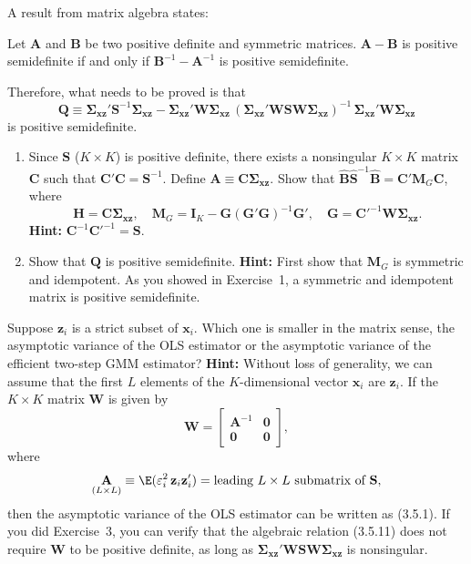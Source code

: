 \begin{problemset}
A result from matrix algebra states:

Let $\mathbf{A}$ and $\mathbf{B}$ be two positive definite and symmetric matrices.
$\mathbf{A} - \mathbf{B}$ is positive semidefinite if and only if
$\mathbf{B}^{-1} - \mathbf{A}^{-1}$ is positive semidefinite.

Therefore, what needs to be proved is that
\[
  \mathbf{Q} \equiv
  \boldsymbol{\Sigma}_{\mathbf{xz}}' \mathbf{S}^{-1} \boldsymbol{\Sigma}_{\mathbf{xz}}
  - \boldsymbol{\Sigma}_{\mathbf{xz}}' \mathbf{W} \boldsymbol{\Sigma}_{\mathbf{xz}}\,
  (\boldsymbol{\Sigma}_{\mathbf{xz}}' \mathbf{W} \mathbf{S} \mathbf{W}
  \boldsymbol{\Sigma}_{\mathbf{xz}})^{-1}\,
  \boldsymbol{\Sigma}_{\mathbf{xz}}' \mathbf{W} \boldsymbol{\Sigma}_{\mathbf{xz}}
\]
is positive semidefinite.

\begin{enumerate}[label=(\alph*)]
\item Since $\mathbf{S}$ ($K \times K$) is positive definite, there exists a nonsingular $K \times K$
  matrix $\mathbf{C}$ such that $\mathbf{C}'\mathbf{C} = \mathbf{S}^{-1}$.  Define
  $\mathbf{A} \equiv \mathbf{C}\boldsymbol{\Sigma}_{\mathbf{xz}}$.  Show that
  $\hat{\mathbf{B}} \hat{\mathbf{S}}^{-1} \hat{\mathbf{B}} = \mathbf{C}'\mathbf{M}_G\mathbf{C}$,
  where
  \[
    \mathbf{H} = \mathbf{C}\boldsymbol{\Sigma}_{\mathbf{xz}}, \quad
    \mathbf{M}_G = \mathbf{I}_K - \mathbf{G}(\mathbf{G}'\mathbf{G})^{-1}\mathbf{G}',
    \quad \mathbf{G} = \mathbf{C}'^{-1}\mathbf{W}\boldsymbol{\Sigma}_{\mathbf{xz}}.
  \]
  \textbf{Hint:} $\mathbf{C}^{-1}\mathbf{C}'^{-1} = \mathbf{S}$.

\item Show that $\mathbf{Q}$ is positive semidefinite.
  \textbf{Hint:} First show that $\mathbf{M}_G$ is symmetric and idempotent.  As you showed in
  Exercise~1, a symmetric and idempotent matrix is positive semidefinite.
\end{enumerate}

\exercise[4]
Suppose $\mathbf{z}_i$ is a strict subset of $\mathbf{x}_i$.  Which one is smaller in the matrix sense,
the asymptotic variance of the OLS estimator or the asymptotic variance of
the efficient two-step GMM estimator?  \textbf{Hint:} Without loss of generality, we can
assume that the first $L$ elements of the $K$-dimensional vector $\mathbf{x}_i$ are $\mathbf{z}_i$.
If the $K \times K$ matrix $\mathbf{W}$ is given by
\[
  \mathbf{W} = \begin{bmatrix} \mathbf{A}^{-1} & \mathbf{0} \\
  \mathbf{0} & \mathbf{0} \end{bmatrix},
\]
where
\[
  \underset{(L \times L)}{\mathbf{A}} \equiv \E(\varepsilon_i^2\, \mathbf{z}_i \mathbf{z}_i')
  = \text{leading } L \times L \text{ submatrix of } \mathbf{S},
\]
then the asymptotic variance of the OLS estimator can be written as (3.5.1).
If you did Exercise~3, you can verify that the algebraic relation (3.5.11) does not
require $\mathbf{W}$ to be positive definite, as long as
$\boldsymbol{\Sigma}_{\mathbf{xz}}' \mathbf{W} \mathbf{S} \mathbf{W} \boldsymbol{\Sigma}_{\mathbf{xz}}$
is nonsingular.


\end{problemset}
